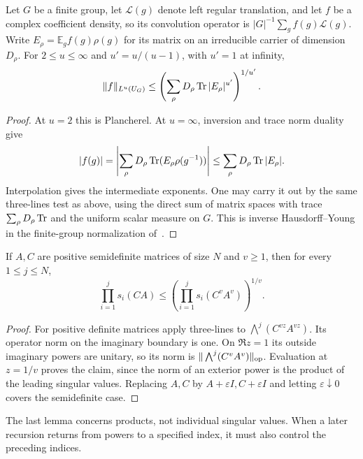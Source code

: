 \begin{lemma}\label{lem:inverse-fourier-bound}
Let $G$ be a finite group, let $\mathcal L(g)$ denote left regular
translation, and let $f$ be a complex coefficient density, so its
convolution operator is $|G|^{-1}\sum_g f(g)\mathcal L(g)$.
Write $E_\rho=\mathbb E_g f(g)\rho(g)$ for its matrix on an
irreducible carrier of dimension $D_\rho$. For $2\le u\le\infty$
and $u'=u/(u-1)$, with $u'=1$ at infinity,
\begin{equation}\label{eq:inverse-fourier-bound}
 \|f\|_{L^u(U_G)}
 \le\left(\sum_\rho D_\rho\operatorname{Tr}|E_\rho|^{u'}\right)^{1/u'}.
\end{equation}
\end{lemma}
\begin{proof}
At $u=2$ this is Plancherel. At $u=\infty$, inversion and trace
norm duality give
\[
 |f(g)|=\left|\sum_\rho D_\rho
             \operatorname{Tr}(E_\rho\rho(g^{-1}))\right|
 \le\sum_\rho D_\rho\operatorname{Tr}|E_\rho|.
\]
Interpolation gives the intermediate exponents. One may carry it
out by the same three-lines test as above, using the direct sum of
matrix spaces with trace $\sum_\rho D_\rho\operatorname{Tr}$ and the uniform
scalar measure on $G$. This is inverse Hausdorff--Young in the
finite-group normalization of~\cite[Lemma~5.1(2)]{garcia-cuerva-parcet2004}.
\end{proof}

\begin{lemma}
\label{lem:power-product-comparison}
If $A,C$ are positive semidefinite matrices of size $N$ and $v\ge1$,
then for every $1\le j\le N$,
\begin{equation}\label{eq:power-product-comparison}
 \prod_{i=1}^j s_i(CA)
 \le\left(\prod_{i=1}^j s_i(C^vA^v)\right)^{1/v}.
\end{equation}
\end{lemma}
\begin{proof}
For positive definite matrices apply three-lines to
$\bigwedge^j(C^{vz}A^{vz})$. Its operator norm on the imaginary
boundary is one. On $\Re z=1$ its outside imaginary powers are
unitary, so its norm is $\|\bigwedge^j(C^vA^v)\|_{\mathrm{op}}$.
Evaluation at $z=1/v$ proves the claim, since the norm of an
exterior power is the product of the leading singular values.
Replacing $A,C$ by $A+\varepsilon I,C+\varepsilon I$ and letting
$\varepsilon\downarrow0$ covers the semidefinite case.
\end{proof}
The last lemma concerns products, not individual singular values.
When a later recursion returns from powers to a specified index,
it must also control the preceding indices.
